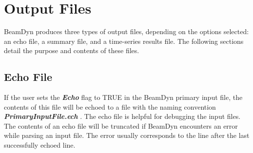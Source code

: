 \chapter{Output Files}
\label{sec:OutputFiles}

BeamDyn produces three types of output files, depending on the options selected: an echo file, a summary file, and a time-series results file. The following sections detail the purpose and contents of these files.

\section{Echo File}
If the user sets the  \textbf{\textit{Echo} } flag to TRUE in the BeamDyn primary input file, the contents of this file will be echoed to a file with the naming convention  \textbf{\textit{PrimaryInputFile.ech} }. The echo file is helpful for debugging the input files. The contents of an echo file will be truncated if BeamDyn encounters an error while parsing an input file. The error usually corresponds to the line after the last successfully echoed line.

